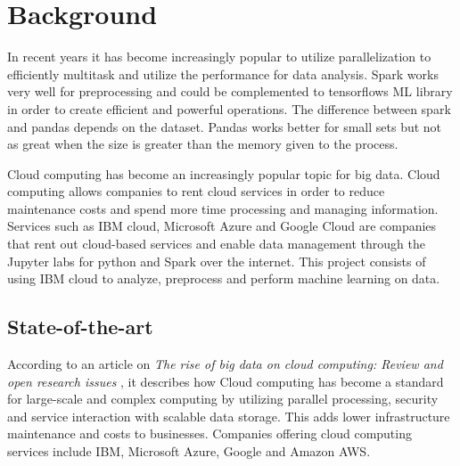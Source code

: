 \documentclass[../main.tex]{subfiles}
\begin{document}
\section{Background}

In recent years it has become increasingly popular to utilize parallelization to efficiently multitask and utilize the performance for data analysis. Spark works very well for preprocessing and could be complemented to tensorflows ML library in order to create efficient and powerful operations. The difference between spark and pandas depends on the dataset. Pandas works better for small sets but not as great when the size is greater than the memory given to the process.

Cloud computing has become an increasingly popular topic for big data. Cloud computing allows companies to rent cloud services in order to reduce maintenance costs and spend more time processing and managing information. Services such as IBM cloud, Microsoft Azure and Google Cloud are companies that rent out cloud-based services and enable data management through the Jupyter labs for python and Spark over the internet. This project consists of using IBM cloud to analyze, preprocess and perform machine learning on data.

\subsection{State-of-the-art}
According to an article on \textit{The rise of big data on cloud computing: Review and open research issues} \cite{hashem2015rise}, it describes how Cloud computing has become a standard for large-scale and complex computing by utilizing parallel processing, security and service interaction with scalable data storage. This adds lower infrastructure maintenance and costs to businesses. Companies offering cloud computing services include IBM, Microsoft Azure, Google and Amazon AWS.
\end{document}

